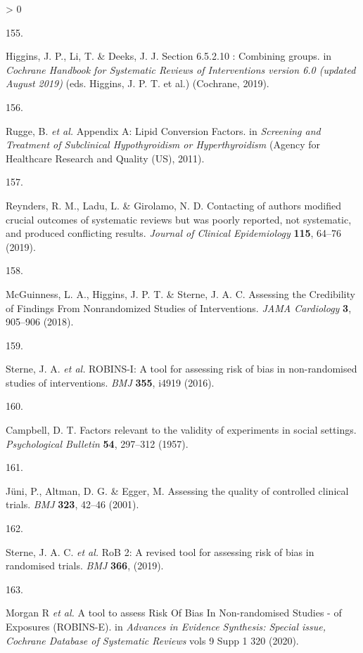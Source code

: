 \documentclass[a4paper, twoside]{templates/ociamthesis}
\newlength{\cslhangindent}
\newlength{\csllabelwidth}
\newenvironment{CSLReferences}[3] %
 {%
  \setlength{\parindent}{0pt}
  \ifodd #1 \everypar{\setlength{\hangindent}{\cslhangindent}}\ignorespaces\fi
  \ifnum #2 > 0
  \setlength{\parskip}{#2\baselineskip}
  \fi
 }%
 {}
\newcommand{\CSLLeftMargin}[1]{\parbox[t]{\maxof{\widthof{#1}}{\csllabelwidth}}{#1}}
\newcommand{\CSLRightInline}[1]{\parbox[t]{\linewidth - \csllabelwidth}{#1}}
\begin{document}
\begin{CSLReferences}{0}{0}
\leavevmode\hypertarget{ref-higgins2019}{}%
\CSLLeftMargin{155. }
\CSLRightInline{Higgins, J. P., Li, T. \& Deeks, J. J. Section 6.5.2.10 : Combining groups. in \emph{Cochrane {Handbook} for {Systematic Reviews} of {Interventions} version 6.0 (updated {August} 2019)} (eds. Higgins, J. P. T. et al.) ({Cochrane}, 2019).}

\leavevmode\hypertarget{ref-rugge2011}{}%
\CSLLeftMargin{156. }
\CSLRightInline{Rugge, B. \emph{et al.} Appendix {A}: Lipid {Conversion Factors}. in \emph{Screening and {Treatment} of {Subclinical Hypothyroidism} or {Hyperthyroidism}} ({Agency for Healthcare Research and Quality (US)}, 2011).}

\leavevmode\hypertarget{ref-reynders2019}{}%
\CSLLeftMargin{157. }
\CSLRightInline{Reynders, R. M., Ladu, L. \& Girolamo, N. D. Contacting of authors modified crucial outcomes of systematic reviews but was poorly reported, not systematic, and produced conflicting results. \emph{Journal of Clinical Epidemiology} \textbf{115}, 64--76 (2019).}

\leavevmode\hypertarget{ref-mcguinness2018}{}%
\CSLLeftMargin{158. }
\CSLRightInline{McGuinness, L. A., Higgins, J. P. T. \& Sterne, J. A. C. Assessing the {Credibility} of {Findings From Nonrandomized Studies} of {Interventions}. \emph{JAMA Cardiology} \textbf{3}, 905--906 (2018).}

\leavevmode\hypertarget{ref-sterne2016}{}%
\CSLLeftMargin{159. }
\CSLRightInline{Sterne, J. A. \emph{et al.} {ROBINS}-{I}: A tool for assessing risk of bias in non-randomised studies of interventions. \emph{BMJ} \textbf{355}, i4919 (2016).}

\leavevmode\hypertarget{ref-campbell1957}{}%
\CSLLeftMargin{160. }
\CSLRightInline{Campbell, D. T. Factors relevant to the validity of experiments in social settings. \emph{Psychological Bulletin} \textbf{54}, 297--312 (1957).}

\leavevmode\hypertarget{ref-juni2001}{}%
\CSLLeftMargin{161. }
\CSLRightInline{Jüni, P., Altman, D. G. \& Egger, M. Assessing the quality of controlled clinical trials. \emph{BMJ} \textbf{323}, 42--46 (2001).}

\leavevmode\hypertarget{ref-sterne2019}{}%
\CSLLeftMargin{162. }
\CSLRightInline{Sterne, J. A. C. \emph{et al.} {RoB} 2: A revised tool for assessing risk of bias in randomised trials. \emph{BMJ} \textbf{366}, (2019).}

\leavevmode\hypertarget{ref-morganr2020}{}%
\CSLLeftMargin{163. }
\CSLRightInline{Morgan R \emph{et al.} A tool to assess {Risk Of Bias In Non}-randomised {Studies} - of {Exposures} ({ROBINS}-{E}). in \emph{Advances in {Evidence Synthesis}: Special issue, {Cochrane Database} of {Systematic Reviews}} vols 9 Supp 1 320 (2020).}


\end{CSLReferences}
\end{document}
